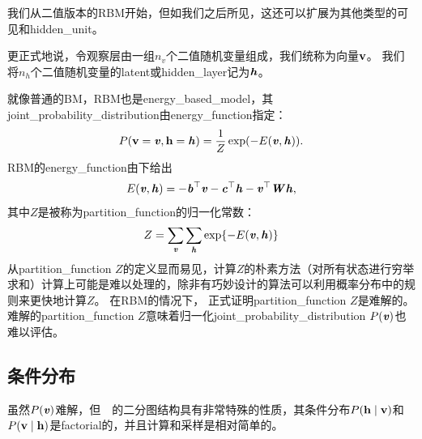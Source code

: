
我们从二值版本的\gls{RBM}开始，但如我们之后所见，这还可以扩展为其他类型的可见和\gls{hidden_unit}。

更正式地说，令观察层由一组$n_v$个二值随机变量组成，我们统称为向量$\mathbf{v}$。
我们将$n_h$个二值随机变量的\gls{latent}或\gls{hidden_layer}记为$\boldsymbol{\mathit{h}}$。

就像普通的\gls{BM}，\gls{RBM}也是\gls{energy_based_model}，其\gls{joint_probability_distribution}由\gls{energy_function}指定：
\begin{align}
 P(\mathbf{v} = \boldsymbol{\mathit{v}}, \mathbf{h} = \boldsymbol{\mathit{h}}) = \frac{1}{Z} \exp(-E(\boldsymbol{\mathit{v}}, \boldsymbol{\mathit{h}})).
\end{align}
RBM的\gls{energy_function}由下给出
\begin{align} \label{eq:205e}
 E(\boldsymbol{\mathit{v}}, \boldsymbol{\mathit{h}}) = -\boldsymbol{\mathit{b}}^\top \boldsymbol{\mathit{v}} - \boldsymbol{\mathit{c}}^\top \boldsymbol{\mathit{h}} - \boldsymbol{\mathit{v}}^\top \boldsymbol{\mathit{W}} \boldsymbol{\mathit{h}},
\end{align}
其中$Z$是被称为\gls{partition_function}的归一化常数：
\begin{align}
 Z = \sum_{\boldsymbol{\mathit{v}}} \sum_{\boldsymbol{\mathit{h}}} \exp \{-E(\boldsymbol{\mathit{v}}, \boldsymbol{\mathit{h}}) \}
\end{align}
从\gls{partition_function} $Z$的定义显而易见，计算$Z$的朴素方法（对所有状态进行穷举求和）计算上可能是难以处理的，除非有巧妙设计的算法可以利用概率分布中的规则来更快地计算$Z$。
在\gls{RBM}的情况下， \citet{long10rbm}正式证明\gls{partition_function} $Z$是难解的。
难解的\gls{partition_function} $Z$意味着归一化\gls{joint_probability_distribution} $P(\boldsymbol{\mathit{v}})$也难以评估。


\subsection{条件分布}
\label{sec:conditional_distributions_chap20}
虽然$P(\boldsymbol{\mathit{v}})$难解，但~~的二分图结构具有非常特殊的性质，其条件分布$P(\mathbf{h} \mid \mathbf{v})$和$P(\mathbf{v}\mid\mathbf{h})$是\gls{factorial}的，并且计算和采样是相对简单的。


